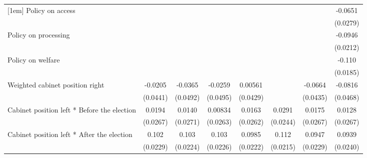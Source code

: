 \begin{table}[htbp]
\begin{tabular}{l*{7}{c}}
[1em]
Policy on access    &                     &                     &                     &                     &                     &                     &     -0.0651\sym{*}  \\
                    &                     &                     &                     &                     &                     &                     &    (0.0279)         \\
[1em]
Policy on processing&                     &                     &                     &                     &                     &                     &     -0.0946\sym{***}\\
                    &                     &                     &                     &                     &                     &                     &    (0.0212)         \\
[1em]
Policy on welfare   &                     &                     &                     &                     &                     &                     &      -0.110\sym{***}\\
                    &                     &                     &                     &                     &                     &                     &    (0.0185)         \\
[1em]
Weighted cabinet position right&     -0.0205         &     -0.0365         &     -0.0259         &     0.00561         &                     &     -0.0664         &     -0.0816         \\
                    &    (0.0441)         &    (0.0492)         &    (0.0495)         &    (0.0429)         &                     &    (0.0435)         &    (0.0468)         \\
[1em]
Cabinet position left * Before the election&      0.0194         &      0.0140         &     0.00834         &      0.0163         &      0.0291         &      0.0175         &      0.0128         \\
                    &    (0.0267)         &    (0.0271)         &    (0.0263)         &    (0.0262)         &    (0.0244)         &    (0.0267)         &    (0.0267)         \\
[1em]
Cabinet position left * After the election&       0.102\sym{***}&       0.103\sym{***}&       0.103\sym{***}&      0.0985\sym{***}&       0.112\sym{***}&      0.0947\sym{***}&      0.0939\sym{***}\\
                    &    (0.0229)         &    (0.0224)         &    (0.0226)         &    (0.0222)         &    (0.0215)         &    (0.0229)         &    (0.0240)         \\

\end{tabular}
\end{table}
